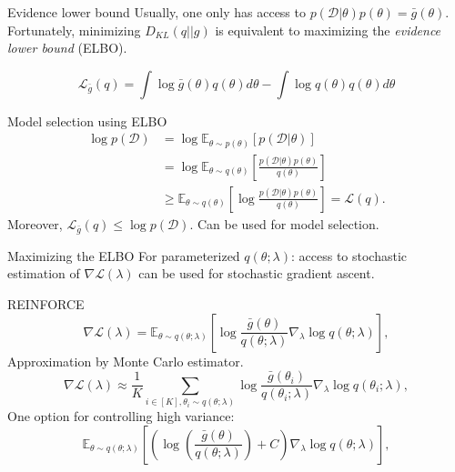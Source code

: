 \documentclass{beamer}
\def \Ev {{\mathbb E}}
\def \gu {{\bar{g}}}
\begin{document}
\begin{frame}{}
\begin{block}{Evidence lower bound}
Usually, one only has access to $p(\mathcal{D}|\theta) p(\theta) = \gu(\theta)$. Fortunately, minimizing $D_{KL}(q||g)$ is equivalent to maximizing the \textit{evidence lower bound} (ELBO).

\begin{equation*}
\mathcal{L}_\gu(q) = 
\int \log \gu(\theta) q(\theta) d\theta - \int \log q(\theta) q(\theta) d\theta
\end{equation*}
\end{block}{}
\begin{block}{Model selection using ELBO}
\begin{equation*}
\begin{split}
\log p(\mathcal{D}) & = \log \Ev_{\theta \sim p(\theta)} [p(\mathcal{D}|\theta)] \\
& = \log \Ev_{\theta \sim q(\theta)} \left[\frac{p(\mathcal{D}|\theta) p(\theta)}{q(\theta)} \right] \\
& \geq \Ev_{\theta \sim q(\theta)} \left[ \log \frac{p(\mathcal{D}|\theta) p(\theta)}{q(\theta)} \right] = \mathcal{L}(q).
\end{split}
\end{equation*}
Moreover, $\mathcal{L}_\gu(q) \leq \log p(\mathcal{D})$. Can be used for model selection.
\end{block}
\end{frame}
\begin{frame}
\begin{block}{Maximizing the ELBO}
For parameterized $q(\theta;\lambda)$: access to stochastic estimation of $\nabla \mathcal{L}(\lambda)$ can be used for stochastic gradient ascent.
\end{block}
\begin{block}{REINFORCE}
\begin{equation*}\label{reinforce}
\nabla \mathcal{L}(\lambda) = \Ev_{\theta \sim q(\theta;\lambda)} \left[ \log \frac{\gu(\theta)}{q(\theta;\lambda)} \nabla_{\lambda} \log q(\theta;\lambda) \right], 
\end{equation*}
Approximation by Monte Carlo estimator. 
\begin{equation*}\label{reinforcemc}
\nabla \mathcal{L}(\lambda) \approx \frac{1}{K} \sum_{i \in [K], \theta_i \sim q(\theta;\lambda)} \log \frac{\gu(\theta_i)}{q(\theta_i;\lambda)} \nabla_{\lambda} \log q(\theta_i;\lambda),
\end{equation*}
One option for controlling high variance:
\begin{equation*}
\Ev_{\theta \sim q(\theta;\lambda)} \left[ \left( \log \left( \frac{\gu(\theta)}{q(\theta;\lambda)}\right) + C\right) \nabla_{\lambda} \log q(\theta;\lambda) \right], 
\end{equation*}
\end{block}
\end{frame}
\end{document}
